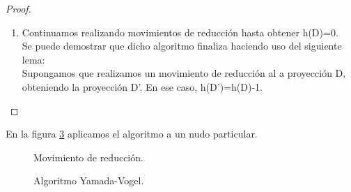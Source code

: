 \begin{proof}
\begin{enumerate}
		Si h(D)=0, entonces D ya representa una trenza cerrada, finalizo.\\
		Si h(D)$ > $0, podemos encontrar un arco que una dos pares de círculos de Seifert incoherentes (se conoce como arco de reducción). Se puede de ver cómo representaremos un arco de reducción entre dos círculos de Seifert en la figura \ref{prueale2}.
		\begin{figure}[h!]
			\centering
			\texttt{[image: inudos/ima10.png]}
			\caption{Arco de reducción.}
			\label{prueale2} 
		\end{figure}
		
		 Este arco de reducción nos sirve de guía para realizar un movimiento de reducción sobre ambos círculos de Seifert de modo que obtenemos la primera proyección de la figura \ref{prueale3}. Con las siguientes imágenes de la figura vemos que efectivamente se conservan los círculos de Seifert originales pero hemos conseguido que ahora sean coherentes. 
		\begin{figure}[h!]
			\centering
			\texttt{[image: inudos/ima11.png]}
			\caption{Movimiento de reducción.}
			\label{prueale3} 
		\end{figure}
	
		
		\item Continuamos realizando movimientos de reducción hasta obtener h(D)=0.\\
		
		Se puede demostrar \cite{13} que dicho algoritmo finaliza haciendo uso del siguiente lema:\\
		Supongamos que realizamos un movimiento de reducción al a proyección D, obteniendo la proyección D'. En ese caso, h(D')=h(D)-1.
		
	\end{enumerate}
\end{proof} 

En la figura \ref{prueale4} aplicamos el algoritmo a un nudo particular. 
		\begin{figure}[h!]
			\centering
			\caption{Movimiento de reducción.}		
			
			\caption{Algoritmo Yamada-Vogel.}
			\label{prueale4} 
		\end{figure}
